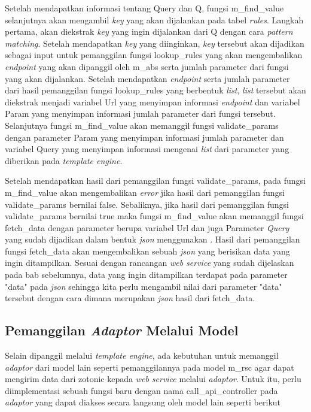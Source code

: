 Setelah mendapatkan informasi tentang Query dan Q, fungsi m\_find\_value selanjutnya akan mengambil \textit{key} yang akan dijalankan pada tabel \textit{rules}. Langkah pertama, akan diekstrak \textit{key} yang ingin dijalankan dari Q dengan cara \textit{pattern matching}. Setelah mendapatkan \textit{key} yang diinginkan, \textit{key} tersebut akan dijadikan sebagai input untuk pemanggilan fungsi lookup\_rules yang akan mengembalikan \textit{endpoint} yang akan dipanggil oleh m\_abs serta jumlah parameter dari fungsi yang akan dijalankan. Setelah mendapatkan \textit{endpoint} serta jumlah parameter dari hasil pemanggilan fungsi lookup\_rules yang berbentuk \textit{list}, \textit{list} tersebut akan diekstrak menjadi variabel Url yang menyimpan informasi \textit{endpoint} dan variabel Param yang menyimpan informasi jumlah parameter dari fungsi tersebut. Selanjutnya fungsi m\_find\_value akan memanggil fungsi validate\_params dengan parameter Param yang menyimpan informasi jumlah parameter dan variabel Query yang menyimpan informasi mengenai \textit{list} dari parameter yang diberikan pada \textit{template engine}.

Setelah mendapatkan hasil dari pemanggilan fungsi validate\_params, pada fungsi m\_find\_value akan mengembalikan \textit{error} jika hasil dari pemanggilan fungsi validate\_params bernilai false. Sebaliknya, jika hasil dari pemanggilan fungsi validate\_params bernilai true maka fungsi m\_find\_value akan memanggil fungsi fetch\_data dengan parameter berupa variabel Url dan juga Parameter \textit{Query} yang sudah dijadikan dalam bentuk \textit{json} menggunakan . Hasil dari pemanggilan fungsi fetch\_data akan mengembalikan sebuah \textit{json} yang berisikan data yang ingin ditampilkan. Sesuai dengan rancangan \textit{web service} yang sudah dijelaskan pada bab sebelumnya, data yang ingin ditampilkan terdapat pada parameter "data" pada \textit{json} sehingga kita perlu mengambil nilai dari parameter "data" tersebut dengan cara  dimana  merupakan \textit{json} hasil dari fetch\_data.

\subsection{Pemanggilan \textit{Adaptor} Melalui Model}

Selain dipanggil melalui \textit{template engine}, ada kebutuhan untuk memanggil \textit{adaptor} dari model lain seperti pemanggilannya pada model m\_rsc agar dapat mengirim data dari zotonic kepada \textit{web service} melalui \textit{adaptor}. Untuk itu, perlu diimplementasi sebuah fungsi baru dengan nama call\_api\_controller pada \textit{adaptor} yang dapat diakses secara langsung oleh model lain seperti berikut

